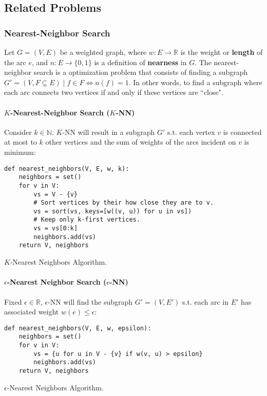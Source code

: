 \clearpage
\subsection{Related Problems}

\subsubsection{Nearest-Neighbor Search}

Let $G = (V, E)$ be a weighted graph, where $w \colon E \to \mathbb{R}$ is the weight or \textbf{length} of the arc $e$, and $n\colon E \to \{0, 1\}$ is a definition of \textbf{nearness} in $G$. The nearest-neighbor search is a optimization problem that consists of finding a subgraph $G' = (V, F \subseteq E) \mid f \in F \iff n(f) = 1$. In other words, to find a subgraph where each arc connects two vertices if and only if these vertices are ``close".

\paragraph{$K$-Nearest-Neighbor Search ($K$-NN)}
Consider $k \in \mathbb{N}$. $K$-NN will result in a subgraph $G'$ s.t. each vertex $v$ is connected at most to $k$ other vertices and the sum of weights of the arcs incident on $v$ is minimum:

\begin{listing}[H]
\begin{verbatim}
def nearest_neighbors(V, E, w, k):
    neighbors = set()
    for v in V:
        vs = V - {v}
        # Sort vertices by their how close they are to v.
        vs = sort(vs, keys=[w((v, u)) for u in vs])
        # Keep only k-first vertices.
        vs = vs[0:k]
        neighbors.add(vs)
    return V, neighbors
\end{verbatim}
\caption{$K$-Nearest Neighbors Algorithm.}
\end{listing}

\paragraph{$\epsilon$-Nearest Neighbor Search ($\epsilon$-NN)}
	Fixed $\epsilon \in\mathbb{R}$, $\epsilon$-NN will find the subgraph $G'=(V, E')$ s.t. each arc in $E'$ has associated weight $w(e) \leq \epsilon$:
	
\begin{listing}[H]
\begin{verbatim}
def nearest_neighbors(V, E, w, epsilon):
    neighbors = set()
    for v in V:
        vs = {u for u in V - {v} if w(v, u) > epsilon}
        neighbors.add(vs)
    return V, neighbors
\end{verbatim}
\caption{$\epsilon$-Nearest Neighbors Algorithm.}
\end{listing}

